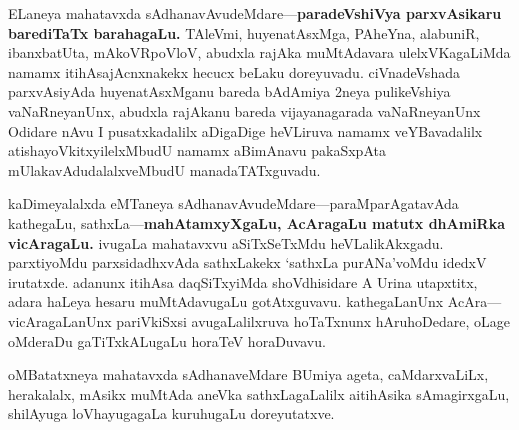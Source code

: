 \documentclass[11pt,a4size]{article}
\begin{document}
ELaneya mahatavxda sAdhanavAvudeMdare---\textbf{paradeVshiVya
  parxvAsikaru barediTaTx barahagaLu.} TAleVmi, huyenatAsxMga,
  PAheYna, alabuniR, ibanxbatUta, mAkoVRpoVloV, 
abudxla rajAka
  muMtAdavara ulelxVKagaLiMda namamx itihAsajAcnxnakekx hecucx beLaku
  doreyuvadu. ciVnadeVshada parxvAsiyAda huyenatAsxMganu bareda
  bAdAmiya 2neya pulikeVshiya vaNaRneyanUnx, abudxla rajAkanu bareda
  vijayanagarada vaNaRneyanUnx Odidare nAvu I pusatxkadalilx aDigaDige
  heVLiruva namamx veYBavadalilx atishayoVkitxyilelxMbudU namamx
  aBimAnavu pakaSxpAta mUlakavAdudalalxveMbudU manadaTATxguvadu.

kaDimeyalalxda eMTaneya sAdhanavAvudeMdare---paraMparAgatavAda
kathegaLu, sathxLa---\textbf{mahAtamxyXgaLu, AcAragaLu matutx dhAmiRka
  vicAragaLu.} ivugaLa mahatavxvu aSiTxSeTxMdu
heVLalikAkxgadu. parxtiyoMdu parxsidadhxvAda sathxLakekx `sathxLa
purANa'voMdu idedxV irutatxde. adanunx itihAsa daqSiTxyiMda
shoVdhisidare A Urina utapxtitx, adara haLeya hesaru muMtAdavugaLu
gotAtxguvavu. kathegaLanUnx AcAra---vicAragaLanUnx pariVkiSxsi
avugaLalilxruva hoTaTxnunx hAruhoDedare, oLage oMderaDu gaTiTxkALugaLu
horaTeV horaDuvavu.

oMBatatxneya mahatavxda sAdhanaveMdare BUmiya ageta, caMdarxvaLiLx,
herakalalx, mAsikx muMtAda aneVka sathxLagaLalilx aitihAsika
sAmagirxgaLu, shilAyuga loVhayugagaLa kuruhugaLu doreyutatxve.
\end{document}

